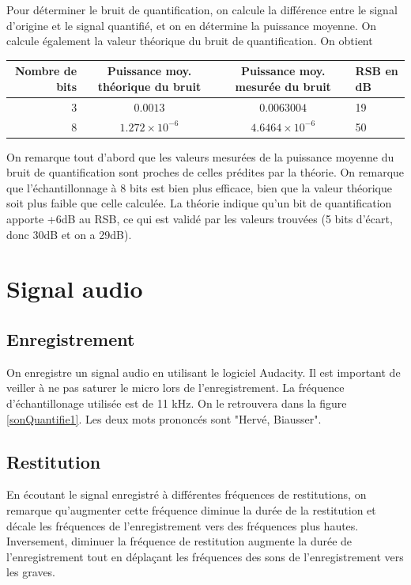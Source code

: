 \documentclass[french]{article}
\begin{document}

Pour déterminer le bruit de quantification, on calcule la différence entre le signal d'origine et le signal quantifié, et on en détermine la puissance moyenne. On calcule également la valeur théorique du bruit de quantification. On obtient

\begin{tabular}{r|c|c|l}
	Nombre de bits & Puissance moy. théorique du bruit & Puissance moy. mesurée du bruit & RSB en dB\\ 
	\hline
	3 & $0.0013$ & $0.0063004$ & 19 \\ 
	\hline
	8 & $1.272 \times 10^{-6}$ & $4.6464\times 10^{-6}$ & 50
\end{tabular} 

On remarque tout d'abord que les valeurs mesurées de la puissance moyenne du bruit de quantification sont proches de celles prédites par la théorie. On remarque que l'échantillonnage à 8 bits est bien plus efficace, bien que la valeur théorique soit plus faible que celle calculée. La théorie indique qu'un bit de quantification apporte +6dB au RSB, ce qui est validé par les valeurs trouvées (5 bits d'écart, donc 30dB et on a 29dB).


\FloatBarrier
\section{ Signal audio}

\subsection{Enregistrement}

On enregistre un signal audio en utilisant le logiciel Audacity. Il est important de veiller à ne pas saturer le micro lors de l'enregistrement. La fréquence d'échantillonage utilisée est de 11 kHz. On le retrouvera dans la figure \ref{sonQuantifie1}. Les deux mots prononcés sont "Hervé, Biausser".

\subsection{ Restitution}

En écoutant le signal enregistré à différentes fréquences de restitutions, on remarque qu'augmenter cette fréquence diminue la durée de la restitution et décale les fréquences de l'enregistrement vers des fréquences plus hautes. Inversement, diminuer la fréquence de restitution augmente la durée de l'enregistrement tout en déplaçant les fréquences des sons de l'enregistrement vers les graves.
\end{document}
